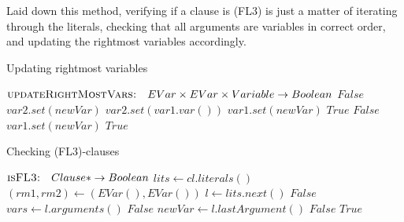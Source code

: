 Laid down this method, verifying if a clause is (FL3) is just a matter of iterating through the literals, checking that all arguments are variables in correct order, and updating the rightmost variables accordingly.
\begin{algorithm}[H]
  \caption{Updating rightmost variables}\label{alg:updateRightMostVars}
  \begin{algorithmic}[1]
      \Statex{}  \(\textsc{updateRightMostVars:} \quad EVar \times EVar \times Variable \to Boolean\)
            \State{} \Return{} \(False\)
          \EndIf{}
                \State{} \(var2.set(newVar)\)
              \Else{}
                \State{} \(var2.set(var1.var())\)
                \State{} \(var1.set(newVar)\)
              \EndIf{}
            \EndCase{}
              \State{} \Return{} \(True\)
            \EndCase{}
            \Default{}
              \State{} \Return{} \(False\)
            \EndDefault{}
          \EndSwitch{}
        \Else{}
          \State{} \(var1.set(newVar)\)
          \EndIf{}
        \State{} \Return{} \(True\)
      \EndFunction{}
  \end{algorithmic}
\end{algorithm}

\begin{algorithm}[H]
  \caption{Checking (FL3)-clauses}
  \begin{algorithmic}[1]
      \Statex{}  \(\textsc{isFL3:} \quad Clause* \to Boolean\)
        \State{} \(lits \gets cl.literals()\)
        \State{} \((rm1,rm2) \gets (EVar(),EVar())\)
          \State{} \(l \gets lits.next()\)
            \State{} \Return{} \(False\)
          \EndIf{}
          \State{} \(vars \gets l.arguments()\)
            \State{} \Return{} \(False\)
          \EndIf{}
          \State{} \(newVar \gets l.lastArgument()\)
            \State{} \Return{} \(False\)
          \EndIf{}
        \EndWhile{}
        \State{} \Return{} \(True\)
      \EndFunction{}
  \end{algorithmic}
\end{algorithm}

